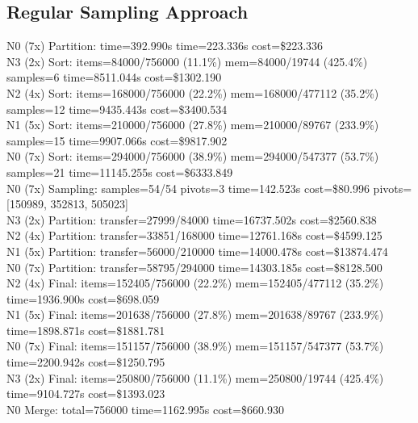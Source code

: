 \documentclass[]{interact}
\theoremstyle{plain}
\theoremstyle{definition}
\theoremstyle{remark}
\begin{document}
\subsection{Regular Sampling Approach}
N0 (7x) Partition: time=392.990\textmu s time=223.336\textmu s cost=\$223.336\\
N3 (2x) Sort: items=84000/756000 (11.1\%) mem=84000/19744 (425.4\%) samples=6 time=8511.044\textmu s cost=\$1302.190\\
N2 (4x) Sort: items=168000/756000 (22.2\%) mem=168000/477112 (35.2\%) samples=12 time=9435.443\textmu s cost=\$3400.534\\
N1 (5x) Sort: items=210000/756000 (27.8\%) mem=210000/89767 (233.9\%) samples=15 time=9907.066\textmu s cost=\$9817.902\\
N0 (7x) Sort: items=294000/756000 (38.9\%) mem=294000/547377 (53.7\%) samples=21 time=11145.255\textmu s cost=\$6333.849\\
N0 (7x) Sampling: samples=54/54 pivots=3 time=142.523\textmu s cost=\$80.996 pivots=[150989, 352813, 505023]\\
N3 (2x) Partition: transfer=27999/84000 time=16737.502\textmu s cost=\$2560.838\\
N2 (4x) Partition: transfer=33851/168000 time=12761.168\textmu s cost=\$4599.125\\
N1 (5x) Partition: transfer=56000/210000 time=14000.478\textmu s cost=\$13874.474\\
N0 (7x) Partition: transfer=58795/294000 time=14303.185\textmu s cost=\$8128.500\\
N2 (4x) Final: items=152405/756000 (22.2\%) mem=152405/477112 (35.2\%) time=1936.900\textmu s cost=\$698.059\\
N1 (5x) Final: items=201638/756000 (27.8\%) mem=201638/89767 (233.9\%) time=1898.871\textmu s cost=\$1881.781\\
N0 (7x) Final: items=151157/756000 (38.9\%) mem=151157/547377 (53.7\%) time=2200.942\textmu s cost=\$1250.795\\
N3 (2x) Final: items=250800/756000 (11.1\%) mem=250800/19744 (425.4\%) time=9104.727\textmu s cost=\$1393.023\\
N0 Merge: total=756000 time=1162.995\textmu s cost=\$660.930
\end{document}
